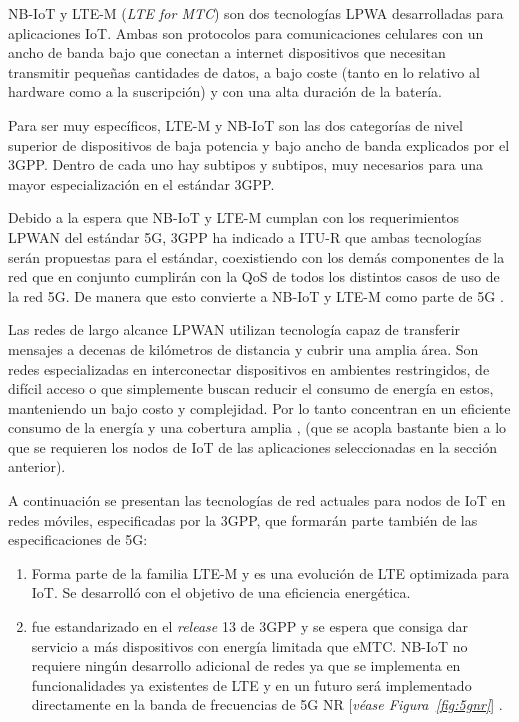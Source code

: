 NB-IoT y LTE-M (\textit{LTE for MTC}) son dos tecnologías LPWA desarrolladas para aplicaciones IoT. Ambas son protocolos para comunicaciones celulares con un ancho de banda bajo que conectan a internet dispositivos que necesitan transmitir pequeñas cantidades de datos, a bajo coste (tanto en lo relativo al hardware como a la suscripción) y con una alta duración de la batería.\newline

Para ser muy específicos, LTE-M y NB-IoT son las dos categorías de nivel superior de dispositivos de baja potencia y bajo ancho de banda explicados por el 3GPP. Dentro de cada uno hay subtipos y subtipos, muy necesarios para una mayor especialización en el estándar 3GPP. \newline

Debido a la espera que NB-IoT y LTE-M cumplan con los requerimientos LPWAN del estándar 5G, 3GPP ha indicado a ITU-R que ambas tecnologías serán propuestas para el estándar, coexistiendo con los demás componentes de la red que en conjunto cumplirán con la QoS de todos los distintos casos de uso de la red 5G. De manera que esto convierte a NB-IoT y LTE-M como parte de 5G \parencite{EricssonAB2016}. \newline

Las redes de largo alcance LPWAN utilizan tecnología capaz de transferir mensajes a decenas de kilómetros de distancia y cubrir una amplia área. Son redes especializadas en interconectar dispositivos en ambientes restringidos, de difícil acceso o que simplemente buscan reducir el consumo de energía en estos, manteniendo un bajo costo y complejidad. Por lo tanto concentran en un eficiente consumo de la energía y una cobertura amplia \parencite{NetTrafficIoT}, (que se acopla bastante bien a lo que se requieren los nodos de IoT de las aplicaciones seleccionadas en la sección anterior). \newline

A continuación se presentan las tecnologías de red actuales para nodos de IoT en redes móviles, especificadas por la 3GPP, que formarán parte también de las especificaciones de 5G:
\begin{enumerate}
    \item \textit{} Forma parte de la familia LTE-M y es una evolución de LTE optimizada para IoT. Se desarrolló con el objetivo de una eficiencia energética.
    \item \textit{} fue estandarizado en el \textit{release }13 de 3GPP y se espera que consiga dar servicio a más dispositivos con energía limitada que eMTC. NB-IoT no requiere ningún desarrollo adicional de redes ya que se implementa en funcionalidades ya existentes de LTE \parencite{NetTrafficIoT} y en un futuro será implementado directamente en la banda de frecuencias de 5G NR [\textit{véase Figura~\ref{fig:5gnr}}] \parencite{EricssonAB2016}.
\end{enumerate}

